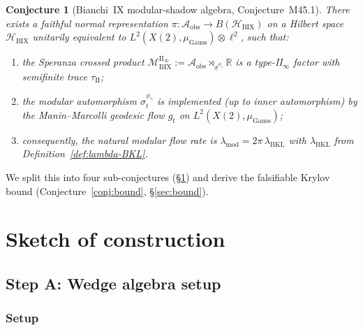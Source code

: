 \documentclass[12pt,a4paper]{article}
\newtheorem{conjecture}{Conjecture}
\begin{document}
\begin{conjecture}[Bianchi~IX modular-shadow algebra,
Conjecture~M45.1]\label{conj:central}
There exists a faithful normal representation
$\pi:\mathcal{A}_{\mathrm{obs}}\to B(\mathcal{H}_{\mathrm{BIX}})$
on a Hilbert space $\mathcal{H}_{\mathrm{BIX}}$ unitarily equivalent
to $L^2(X(2),\mu_{\mathrm{Gauss}})\otimes\ell^2$, such that:
\begin{enumerate}
\item[(i)] the Speranza crossed product
$\mathcal{M}_{\mathrm{BIX}}^{\mathrm{II}_\infty}
:= \mathcal{A}_{\mathrm{obs}}\rtimes_{\sigma^{\phi_\gamma}}\mathbb{R}$
is a type-II$_\infty$ factor with semifinite trace $\tau_{\mathrm{II}}$;
\item[(ii)] the modular automorphism $\sigma_t^{\phi_\gamma}$ is
implemented (up to inner automorphism) by the Manin--Marcolli geodesic
flow $g_t$ on $L^2(X(2),\mu_{\mathrm{Gauss}})$;
\item[(iii)] consequently, the natural modular flow rate is
$\lambda_{\mathrm{mod}} = 2\pi\,\lambda_{\mathrm{BKL}}$ with
$\lambda_{\mathrm{BKL}}$ from Definition~\ref{def:lambda-BKL}.
\end{enumerate}
\end{conjecture}

We split this into four sub-conjectures (\S\ref{sec:construction})
and derive the falsifiable Krylov bound
(Conjecture~\ref{conj:bound}, \S\ref{sec:bound}).

\section{Sketch of construction}\label{sec:construction}

\subsection{Step A: Wedge algebra setup}\label{ssec:wedge}

\subsubsection*{Setup}
\end{document}
